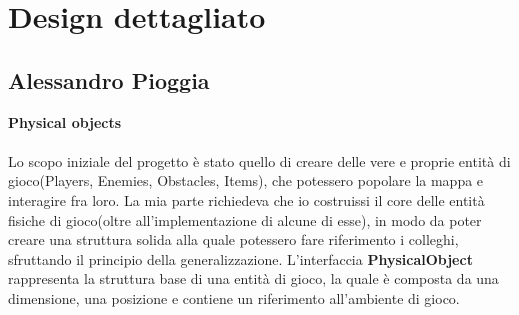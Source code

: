 \newpage

\section{Design dettagliato}

\subsection*{Alessandro Pioggia}
\textbf{Physical objects} \\ \\
Lo scopo iniziale del progetto è stato quello di creare delle vere e proprie entità di gioco(Players, Enemies, Obstacles, Items), che potessero popolare la mappa e interagire fra loro.
La mia parte richiedeva che io costruissi il core delle entità fisiche di gioco(oltre all'implementazione di alcune di esse), in modo da poter creare una struttura solida alla quale potessero fare riferimento i colleghi, sfruttando il principio della generalizzazione.
L'interfaccia \textbf{PhysicalObject} rappresenta la struttura base di una entità di gioco, la quale è composta da una dimensione, una posizione e contiene un riferimento all'ambiente di gioco. \\ \\

